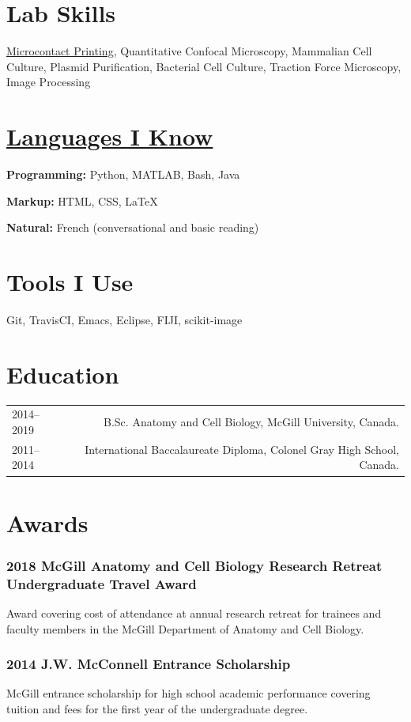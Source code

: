 \documentclass[%
	12pt,%
	]
	{article}
\begin{document}
\section*{Lab Skills}

\href{https://jidicula.github.io/images/micropattern.jpg}{Microcontact Printing}, Quantitative Confocal Microscopy, Mammalian Cell Culture, Plasmid Purification, Bacterial Cell Culture, Traction Force Microscopy, Image Processing


\section*{\href{https://github.com/jidicula}{Languages I Know}}

\textbf{Programming:} Python, MATLAB, Bash, Java

\textbf{Markup:} HTML, CSS, \LaTeX{}

\textbf{Natural:} French (conversational and basic reading)

\section*{Tools I Use}

Git, TravisCI, Emacs, Eclipse, FIJI, scikit-image

\section*{Education}
\begin{tabular}{LR}
2014--2019&B.Sc. Anatomy and Cell Biology, McGill University, Canada.\\[5pt]
2011--2014&International Baccalaureate Diploma, Colonel Gray High School, Canada.\\
\end{tabular}

\section*{Awards}
\subsubsection*{2018 McGill Anatomy and Cell Biology Research Retreat Undergraduate Travel Award}
Award covering cost of attendance at annual research retreat for trainees and faculty members in the McGill Department of Anatomy and Cell Biology.

\subsubsection*{2014 J.W. McConnell Entrance Scholarship}
McGill entrance scholarship for high school academic performance covering tuition and fees for the first year of the undergraduate degree.
\end{document}
